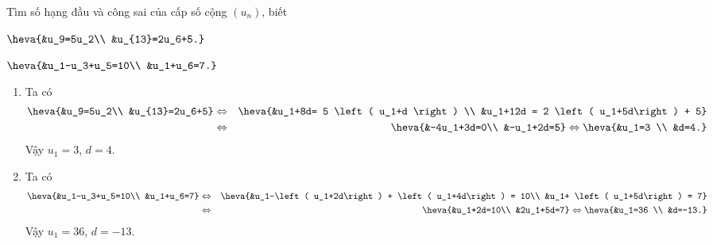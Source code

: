 \begin{vd}[VD]%
	Tìm số hạng đầu và công sai của cấp số cộng $(u_n)$, biết
		\begin{listEX}[2]
			\item $\heva{&u_9=5u_2\\ &u_{13}=2u_6+5.}$
			\item $\heva{&u_1-u_3+u_5=10\\ &u_1+u_6=7.}$
		\end{listEX}
	\loigiai
	{
		\begin{enumerate}
			\item Ta có
			\begin{eqnarray*}
				\heva{&u_9=5u_2\\ &u_{13}=2u_6+5} &\Leftrightarrow& \heva{&u_1+8d= 5 \left( u_1+d \right) \\ &u_1+12d = 2 \left( u_1+5d\right) + 5}\\
				&\Leftrightarrow& \heva{&-4u_1+3d=0\\ &-u_1+2d=5} \Leftrightarrow \heva{&u_1=3 \\ &d=4.}
			\end{eqnarray*}
			Vậy $u_1=3$, $d=4$.
			\item Ta có 
			\begin{eqnarray*}
				\heva{&u_1-u_3+u_5=10\\ &u_1+u_6=7} &\Leftrightarrow& \heva{&u_1-\left( u_1+2d\right) + \left( u_1+4d\right) = 10\\ &u_1+ \left( u_1+5d\right) = 7}\\
				&\Leftrightarrow& \heva{&u_1+2d=10\\ &2u_1+5d=7} \Leftrightarrow \heva{&u_1=36 \\ &d=-13.}
			\end{eqnarray*}
			Vậy $u_1=36$, $d=-13$.
		\end{enumerate}
	}
\end{vd}

